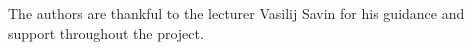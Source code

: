 \documentclass[]{VUMIFTemplateClass}
\begin{document}
The authors are thankful to the lecturer Vasilij Savin for his guidance and
support throughout the project.












\end{document}
